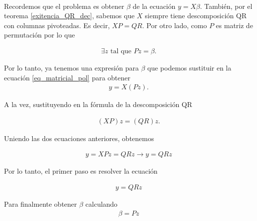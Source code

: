 \\

Recordemos que el problema es obtener $\beta$ de la ecuación $y = X \beta$. También, por el teorema \ref{exitencia_QR_dec}, sabemos que $X$ siempre tiene descomposición QR con columnas pivoteadas. Es decir, $XP = QR$. Por otro lado, como $P$ es matriz de permutación por lo que

\begin{equation*}
    \begin{aligned}
    \exists z \text{ tal que } Pz = \beta .
    \end{aligned}
\end{equation*}

Por lo tanto, ya tenemos una expresión para $\beta$ que podemos sustituir en la ecuación \ref{eq_matricial_pol} para obtener 
\begin{equation*}
    \begin{aligned}
    y = X (Pz) . 
    \end{aligned}
\end{equation*}

A la vez, sustituyendo en la fórmula de la descomposición QR

\begin{equation*}
    \begin{aligned}
    (XP) z = (QR) z . 
    \end{aligned}
\end{equation*}

Uniendo las dos ecuaciones anteriores, obtenemos 

\begin{equation*}
    \begin{aligned}
    y = XP z = QR z 
    \longrightarrow y = QRz
    \end{aligned}
\end{equation*}

Por lo tanto, el primer paso es resolver la ecuación 

\begin{equation*}
    \begin{aligned}
    y = QRz
    \end{aligned}
\end{equation*}

Para finalmente obtener $\beta$ calculando 
\begin{equation*}
    \begin{aligned}
    \beta = Pz
    \end{aligned}
\end{equation*}

